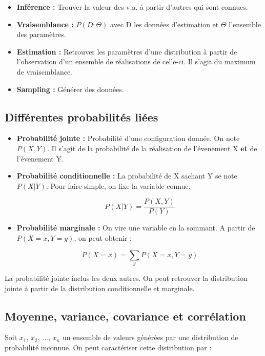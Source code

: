 \documentclass{article}
\begin{document}
\begin{itemize}
\item \textbf{Inférence :} Trouver la valeur des v.a. à partir d'autres qui sont connues.

\item \textbf{Vraisemblance :} $P(D; \Theta)$ avec D les données d'estimation et $\Theta$ l'ensemble des paramètres.

\item \textbf{Estimation :} Retrouver les paramètres d'une distribution à partir de l'observation d'un ensemble de réalisations de celle-ci. Il s'agit du maximum de vraisemblance.

\item \textbf{Sampling :} Générer des données.

\end{itemize}

\subsection{Différentes probabilités liées}

\begin{itemize}

\item \textbf{Probabilité jointe :} Probabilité d'une configuration donnée. On note $P(X, Y)$. Il s'agit de la probabilité de la réalisation de l'évenement X \textbf{et} de l'évenement Y.

\item \textbf{Probabilité conditionnelle :} La probabilité de X sachant Y se note $P(X|Y)$. Pour faire simple, on fixe la variable connue.

\[ P(X|Y) = \frac{P(X, Y)}{P(Y)} \]
 
\item \textbf{Probabilité marginale :} On vire une variable en la sommant. A partir de $P(X = x, Y = y)$, on peut obtenir :

\[ P(X = x) = \sum_{y} P(X = x, Y = y) \]

\end{itemize}

La probabilité jointe inclus les deux autres. On peut retrouver la distribution jointe à partir de la distribution conditionnelle et
marginale.


\subsection{Moyenne, variance, covariance et corrélation}

Soit $x_1$, $x_2$, ..., $x_n$ un ensemble de valeurs générées par une distribution de probabilité inconnue. On peut caractériser cette distribution par : 
\end{document}
